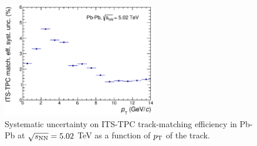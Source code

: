 \begin{figure}
\centering
 \includegraphics[width=0.6\textwidth]{FigCap5/MatchEffSyst_LHC15o_16g1abc_wcutV0multTPCout_wTOFbc_AverITSTPCtracks.eps}
 \caption{Systematic uncertainty on ITS-TPC track-matching efficiency in Pb-Pb at $\sqrt{s_{\rm NN}}=5.02$ TeV as a function of $p_{\rm T}$ of the track.}
 \label{fig:systME_AA}
\end{figure}


